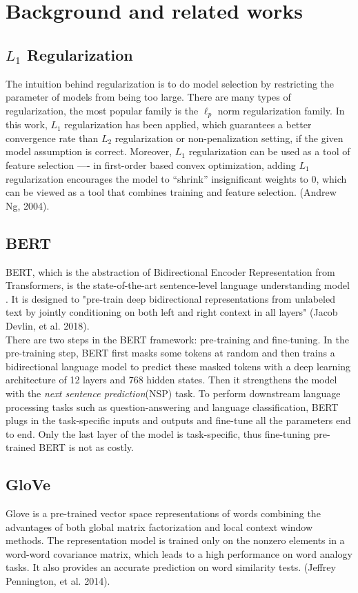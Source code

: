 \documentclass{article}
\begin{document}
\section{Background and related works}

\subsection{$L_1$ Regularization}
The intuition behind regularization is to do model
selection by restricting the parameter of models from being too large. There are
many types of regularization, the most popular family is the $\ell_p$ norm 
regularization family. In this work, $L_1$ regularization has been applied,
which guarantees a better convergence rate than $L_2$ regularization or
non-penalization setting, if the given model assumption is correct. Moreover,
$L_1$ regularization can be used as a tool of feature selection ---- in 
first-order based convex optimization, adding $L_1$ regularization 
encourages the model to ``shrink'' insignificant weights to 0, which can be
viewed as a tool that combines training and feature selection. (Andrew Ng,
2004)\cite{1}.

\subsection{BERT}
BERT, which is the abstraction of Bidirectional Encoder Representation from Transformers, is the state-of-the-art sentence-level language understanding model . It is designed to "pre-train deep bidirectional representations from unlabeled text by jointly conditioning on both left and right context in all layers" (Jacob Devlin, et al. 2018)\cite{2}. \\

There are two steps in the BERT framework: pre-training and fine-tuning. In the pre-training step, BERT first masks some tokens at random and then trains a bidirectional language model to predict these masked tokens with a deep learning architecture of 12 layers and 768 hidden states. Then it strengthens the model with the \textit{next sentence prediction}(NSP) task. To perform downstream language processing tasks such as question-answering and language classification, BERT plugs in the task-specific inputs and outputs and fine-tune all the parameters end to end. Only the last layer of the model is task-specific, thus fine-tuning pre-trained BERT is not as costly.\cite{2}\\

\subsection{GloVe}
Glove is a pre-trained vector space representations of words combining the advantages of both global matrix factorization and local context window methods. The representation model is trained only on the nonzero elements in a word-word covariance matrix, which leads to a high performance on word analogy tasks. It also provides an accurate prediction on word similarity tests. (Jeffrey Pennington, et al. 2014)\cite{4}.
\end{document}
